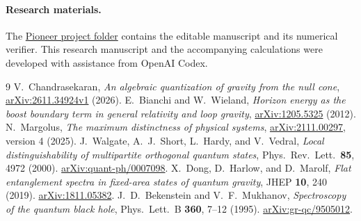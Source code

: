 \documentclass[11pt,letterpaper]{article}
\begin{document}
\paragraph{Research materials.}
The \href{https://github.com/rkka02/pioneer/tree/main/physics/corner-boost-information}{Pioneer project folder} contains the editable manuscript and its numerical verifier. This research manuscript and the accompanying calculations were developed with assistance from OpenAI Codex.

\begin{thebibliography}{9}
V.~Chandrasekaran, \emph{An algebraic quantization of gravity from the null cone},
\href{https://arxiv.org/abs/2611.34924v1}{arXiv:2611.34924v1} (2026).
E.~Bianchi and W.~Wieland, \emph{Horizon energy as the boost boundary term in general relativity and loop gravity},
\href{https://arxiv.org/abs/1205.5325}{arXiv:1205.5325} (2012).
N.~Margolus, \emph{The maximum distinctness of physical systems},
\href{https://arxiv.org/abs/2111.00297}{arXiv:2111.00297}, version 4 (2025).
J.~Walgate, A.~J.~Short, L.~Hardy, and V.~Vedral, \emph{Local distinguishability of multipartite orthogonal quantum states},
Phys.\ Rev.\ Lett.\ \textbf{85}, 4972 (2000).
\href{https://arxiv.org/abs/quant-ph/0007098}{arXiv:quant-ph/0007098}.
X.~Dong, D.~Harlow, and D.~Marolf, \emph{Flat entanglement spectra in fixed-area states of quantum gravity},
JHEP \textbf{10}, 240 (2019).
\href{https://arxiv.org/abs/1811.05382}{arXiv:1811.05382}.
J.~D.~Bekenstein and V.~F.~Mukhanov, \emph{Spectroscopy of the quantum black hole},
Phys.\ Lett.\ B \textbf{360}, 7--12 (1995).
\href{https://arxiv.org/abs/gr-qc/9505012}{arXiv:gr-qc/9505012}.
\end{thebibliography}
\end{document}
